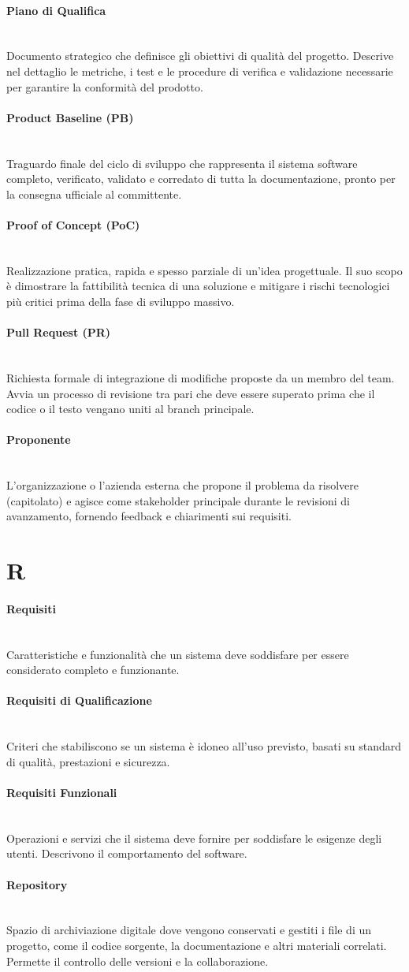\documentclass[a4paper, 10pt, colorlinks=true, linkcolor=black, urlcolor=blue, citecolor=blue, hidelinks]{article}
\newcommand{\glossaryterm}[2]{
    \paragraph{#1 \label{term:#1}} \mbox{} \\
    #2
    \vspace{0.5em}
}
\begin{document}
\glossaryterm{Piano di Qualifica}{Documento strategico che definisce gli obiettivi di qualità del progetto. Descrive nel dettaglio le metriche, i test e le procedure di verifica e validazione necessarie per garantire la conformità del prodotto.}

\glossaryterm{Product Baseline (PB)}{Traguardo finale del ciclo di sviluppo che rappresenta il sistema software completo, verificato, validato e corredato di tutta la documentazione, pronto per la consegna ufficiale al committente.}

\glossaryterm{Proof of Concept (PoC)}{Realizzazione pratica, rapida e spesso parziale di un'idea progettuale. Il suo scopo è dimostrare la fattibilità tecnica di una soluzione e mitigare i rischi tecnologici più critici prima della fase di sviluppo massivo.}

\glossaryterm{Pull Request (PR)}{Richiesta formale di integrazione di modifiche proposte da un membro del team. Avvia un processo di revisione tra pari che deve essere superato prima che il codice o il testo vengano uniti al branch principale.}

\glossaryterm{Proponente}{L'organizzazione o l'azienda esterna che propone il problema da risolvere (capitolato) e agisce come stakeholder principale durante le revisioni di avanzamento, fornendo feedback e chiarimenti sui requisiti.}

\newpage

\section*{R}

\glossaryterm{Requisiti}{Caratteristiche e funzionalità che un sistema deve soddisfare per essere considerato completo e funzionante.}

\glossaryterm{Requisiti di Qualificazione}{Criteri che stabiliscono se un sistema è idoneo all'uso previsto, basati su standard di qualità, prestazioni e sicurezza.}

\glossaryterm{Requisiti Funzionali}{Operazioni e servizi che il sistema deve fornire per soddisfare le esigenze degli utenti. Descrivono il comportamento del software.}

\glossaryterm{Repository}{Spazio di archiviazione digitale dove vengono conservati e gestiti i file di un progetto, come il codice sorgente, la documentazione e altri materiali correlati. Permette il controllo delle versioni e la collaborazione.}
\end{document}
